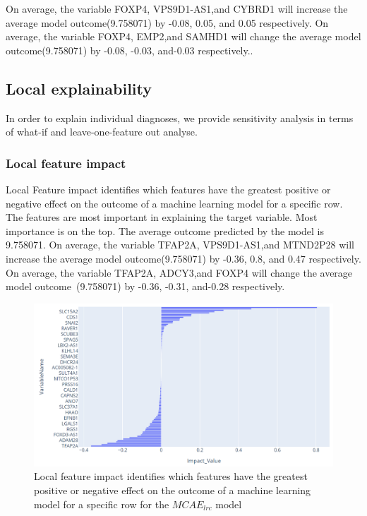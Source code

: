 \hspace*{3.5mm} On average, the variable FOXP4, VPS9D1-AS1,and CYBRD1 will increase the average model outcome(9.758071) by -0.08, 0.05, and 0.05 respectively. On average, the variable FOXP4, EMP2,and SAMHD1 will change the average model outcome(9.758071) by -0.08, -0.03, and-0.03 respectively.. 

\subsection{Local explainability}
In order to explain individual diagnoses, we provide sensitivity analysis in terms of what-if and leave-one-feature out analyse. 

\subsubsection{Local feature impact}
Local Feature impact identifies which features have the greatest positive or negative effect on the outcome of a machine learning model for a specific row. The features are most important in explaining the target variable. Most importance is on the top. The average outcome predicted by the model is 9.758071. On average, the variable TFAP2A, VPS9D1-AS1,and MTND2P28 will increase the average model outcome(9.758071) by -0.36, 0.8, and 0.47 respectively. On average, the variable TFAP2A, ADCY3,and FOXP4 will change the average model outcome~(9.758071) by -0.36, -0.31, and-0.28 respectively.

\begin{figure}[h]
    \centering
	\includegraphics[scale=0.6]{images/local_fi_1.png}
	\caption{Local feature impact identifies which features have the greatest positive or negative effect on the outcome of a machine learning model for a specific row for the $MCAE_{lrc}$ model}
    \label{fig:local_feature_impacts}
\end{figure}

